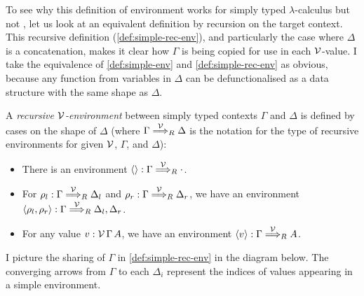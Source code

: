 To see why this definition of environment works for simply typed
$\lambda$-calculus but not \name{}, let us look at an equivalent definition by
recursion on the target context.
This recursive definition (\cref{def:simple-rec-env}), and particularly the
case where $\Delta$ is a concatenation, makes it clear how $\Gamma$ is being
copied for use in each $\mathcal V$-value.
I take the equivalence of \cref{def:simple-env} and \cref{def:simple-rec-env}
as obvious, because any function from variables in $\Delta$ can be
defunctionalised as a data structure with the same shape as $\Delta$.

\begin{definition}\label{def:simple-rec-env}
  A \emph{recursive $\mathcal V$-environment} between simply typed contexts $\Gamma$ and
  $\Delta$ is defined by cases on the shape of $\Delta$ (where
  $\Gamma \stackrel{\mathcal V}\Longrightarrow_R \Delta$ is the notation for the type of recursive
  environments for given $\mathcal V$, $\Gamma$, and $\Delta$):
  \begin{itemize}
    \item There is an environment $\alr{} : \Gamma \env\V_R {\cdot}$.
    \item For $\rho_l : \Gamma \stackrel{\mathcal V}\Longrightarrow_R \Delta_l$ and
      $\rho_r : \Gamma \stackrel{\mathcal V}\Longrightarrow_R \Delta_r$, we have an environment
      $\alr{\rho_l, \rho_r} : \Gamma \env\V_R \Delta_l, \Delta_r$.
    \item For any value $v : \mathcal V\,\Gamma\,A$, we have an environment
      $\alr{v} : \Gamma \env\V_R A$.
  \end{itemize}
\end{definition}

I picture the sharing of $\Gamma$ in \cref{def:simple-rec-env} in the diagram
below.
The converging arrows from $\Gamma$ to each $\Delta_i$ represent the indices of
values appearing in a simple environment.

